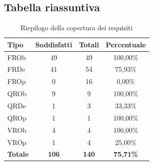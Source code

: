 \documentclass[a4paper, 10pt]{article}
\renewcommand{\arraystretch}{1.2}
\begin{document}
\subsection{Tabella riassuntiva}
\label{sec:tracciamento-riepilogo}

\begin{table}[H]
    \centering
    \renewcommand{\arraystretch}{1.3}
    \begin{tabular}{|l|c|c|c|}
        \hline
        \rowcolor{gray!15}
        \textbf{Tipo} & \textbf{Soddisfatti} & \textbf{Totali} & \textbf{Percentuale} \\
        \hline
        FROb & 49 & 49 & 100,00\% \\ \hline
        FRDe & 41 & 54 & 75,93\% \\ \hline
        FROp & 0 & 16 & 0,00\% \\ \hline
        QROb & 9 & 9 & 100,00\% \\ \hline
        QRDe & 1 & 3 & 33,33\% \\ \hline
        QROp & 1 & 1 & 100,00\% \\ \hline
        VROb & 4 & 4 & 100,00\% \\ \hline
        VROp & 1 & 4 & 25,00\% \\ \hline
        \rowcolor{gray!8}
        \textbf{Totale} & \textbf{106} & \textbf{140} & \textbf{75,71\%} \\ \hline
    \end{tabular}
    \caption{Riepilogo della copertura dei requisiti}\label{tab:tracciamento-riepilogo}
\end{table}
\end{document}
